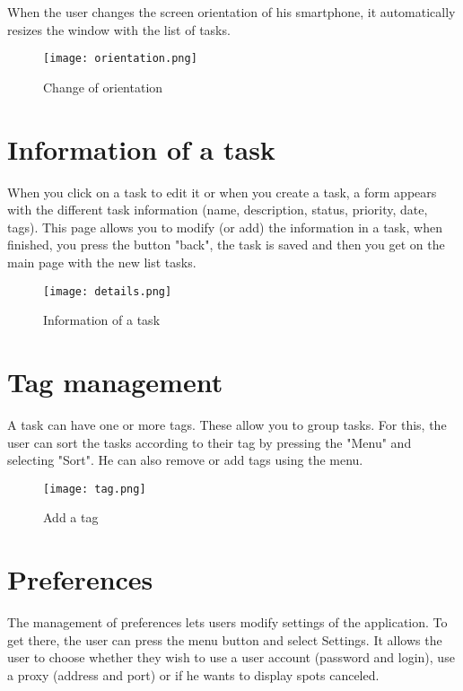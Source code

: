 \noindent When the user changes the screen orientation of his smartphone, it automatically resizes the window with the list of tasks.

\begin{figure}[!ht]
    \centering
    \texttt{[image: orientation.png]}
    \caption{Change of orientation}
\end{figure}

\section{Information of a task}

When you click on a task to edit it or when you create a task, a form appears with the different task information (name, description, status, priority, date, tags). This page allows you to modify (or add) the information in a task, when finished, you press the button "back", the task is saved and then you get on the main page with the new list tasks.

\begin{figure}[!ht]
    \centering
    \texttt{[image: details.png]}
    \caption{Information of a task}
\end{figure}

\section{Tag management}

A task can have one or more tags. These allow you to group tasks. For this, the user can sort the tasks according to their tag by pressing the "Menu" and selecting "Sort". He can also remove or add tags using the menu.

\begin{figure}[!ht]
    \centering
    \texttt{[image: tag.png]}
    \caption{Add a tag}
\end{figure}

\section{Preferences}

The management of preferences lets users modify settings of the application. To get there, the user can press the menu button and select Settings. It allows the user to choose whether they wish to use a user account (password and login), use a proxy (address and port) or if he wants to display spots canceled.

